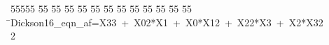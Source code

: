 %
%
\begin{tabbing}
55555 \= 55 \= 55 \= 55 \= 55 \= 55 \= 55 \= 55 \= 55 \= 55 \= 55 \= 55 \= 55 \= \>Dickson16\_eqn\_af=X33\ +\ X02*X1\ +\ X0*X12\ +\ X22*X3\ +\ X2*X32\\[0pt]
2\>\end{tabbing}
